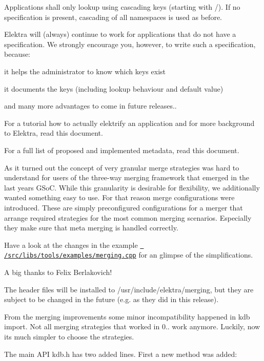 Applications shall only lookup using cascading keys (starting with {\ttfamily /}). If no specification is present, cascading of all namespaces is used as before.

Elektra will (always) continue to work for applications that do not have a specification. We strongly encourage you, however, to write such a specification, because\+:


\begin{DoxyItemize}
\item it helps the administrator to know which keys exist
\item it documents the keys (including lookup behaviour and default value)
\item and many more advantages to come in future releases..
\end{DoxyItemize}

For a tutorial how to actually elektrify an application and for more background to Elektra, read this document.

For a full list of proposed and implemented metadata, read this document.

As it turned out the concept of very granular merge strategies was hard to understand for users of the three-\/way merging framework that emerged in the last year\textquotesingle{}s G\+SoC. While this granularity is desirable for flexibility, we additionally wanted something easy to use. For that reason merge configurations were introduced. These are simply preconfigured configurations for a merger that arrange required strategies for the most common merging scenarios. Especially they make sure that meta merging is handled correctly.

Have a look at the changes in the example \href{https://github.com/ElektraInitiative/libelektra/blob/master/src/libs/tools/examples/merging.cpp}{\texttt{ /src/libs/tools/examples/merging.cpp}} for an glimpse of the simplifications.

A big thanks to Felix Berlakovich!

The header files will be installed to /usr/include/elektra/merging, but they are subject to be changed in the future (e.\+g. as they did in this release).

From the merging improvements some minor incompatibility happened in {\ttfamily kdb import}. Not all merging strategies that worked in 0.. work anymore. Luckily, now its much simpler to choose the strategies.

The main A\+PI kdb.\+h has two added lines. First a new method was added\+:



